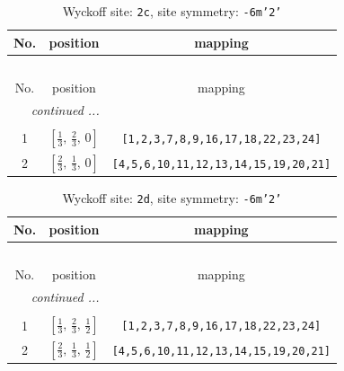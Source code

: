 \documentclass[fleqn,8pt]{jsarticle}
\begin{document}
\begin{longtable}{ccc}
\caption{Wyckoff site: {\tt 2c}, site symmetry: {\tt -6m'2'}}
 \\
 \hline \hline
No. & position & mapping \\ \hline \endfirsthead

\multicolumn{2}{l}{\tablename\ \thetable{}} \\
 \hline \hline
No. & position & mapping \\ \hline \endhead

 \hline \hline
\multicolumn{2}{r}{\footnotesize\it continued ...} \\ \endfoot

 \hline \hline
\multicolumn{2}{r}{} \\ \endlastfoot

1 & $\left[ \frac{1}{3},\, \frac{2}{3},\, 0 \right]$ & {\tt [1,2,3,7,8,9,16,17,18,22,23,24]} \\ \hline
2 & $\left[ \frac{2}{3},\, \frac{1}{3},\, 0 \right]$ & {\tt [4,5,6,10,11,12,13,14,15,19,20,21]} \\
\end{longtable}
\renewcommand{\arraystretch}{1.2}
\begin{longtable}{ccc}
\caption{Wyckoff site: {\tt 2d}, site symmetry: {\tt -6m'2'}}
 \\
 \hline \hline
No. & position & mapping \\ \hline \endfirsthead

\multicolumn{2}{l}{\tablename\ \thetable{}} \\
 \hline \hline
No. & position & mapping \\ \hline \endhead

 \hline \hline
\multicolumn{2}{r}{\footnotesize\it continued ...} \\ \endfoot

 \hline \hline
\multicolumn{2}{r}{} \\ \endlastfoot

1 & $\left[ \frac{1}{3},\, \frac{2}{3},\, \frac{1}{2} \right]$ & {\tt [1,2,3,7,8,9,16,17,18,22,23,24]} \\ \hline
2 & $\left[ \frac{2}{3},\, \frac{1}{3},\, \frac{1}{2} \right]$ & {\tt [4,5,6,10,11,12,13,14,15,19,20,21]} \\
\end{longtable}
\renewcommand{\arraystretch}{1.2}
\end{document}
